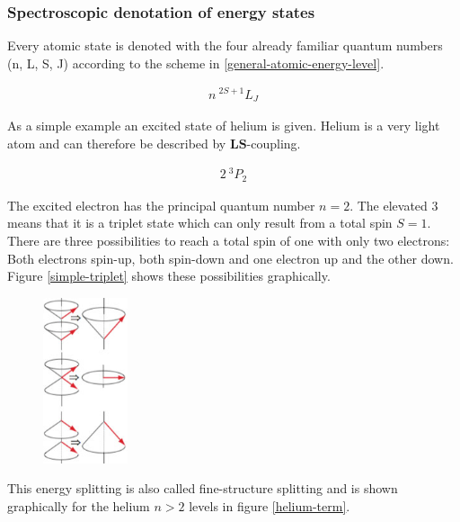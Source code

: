 \documentclass[parskip,12pt,headsepline,a4paper] {scrbook}
\begin{document}
\subsubsection{Spectroscopic denotation of energy states}
\vspace{-1\baselineskip}
Every atomic state is denoted with the four already familiar quantum numbers (n, L, S, J) according to the scheme in \ref{general-atomic-energy-level}.

\begin{align}  \label{general-atomic-energy-level}
n ~ ^{2S+1}L_J
\end{align}

As a simple example an excited state of helium is given. Helium is a very light atom and can therefore be described by $\mathbf{LS}$-coupling.

\begin{align}  \label{atomic-energy-level}
2 ~ ^3P_2
\end{align}

The excited electron has the principal quantum number $n = 2$. The elevated 3 means that it is a triplet state which can only result from a total spin $S = 1$. There are three possibilities to reach a total spin of one with only two electrons: Both electrons spin-up, both spin-down and one electron up and the other down. Figure \ref{simple-triplet} shows these possibilities graphically.

\begin{figure}[ht]
\centerline{
\includegraphics[width=2.5cm]{./spectroscopy/simple-triplet.jpg}}
\end{figure}

This energy splitting is also called fine-structure splitting and is shown graphically for the helium $n > 2$ levels in figure \ref{helium-term}.
\end{document}

